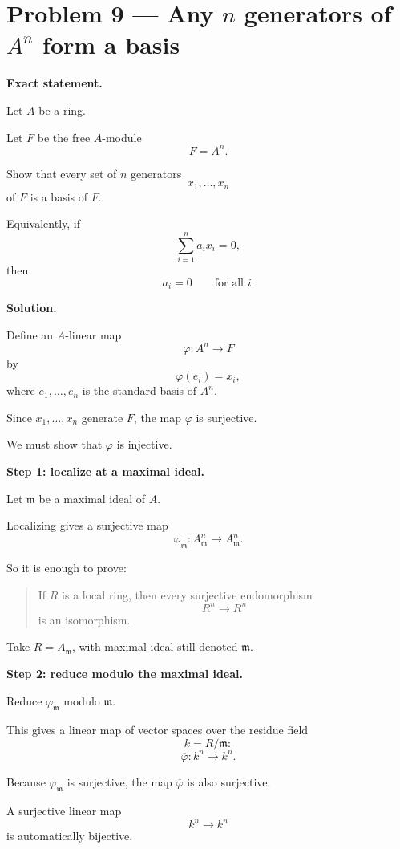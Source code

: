 \documentclass[12pt,a4paper]{article}
\theoremstyle{plain}
\theoremstyle{definition}      %
\begin{document}
	
	\section*{Problem 9 — Any \(n\) generators of \(A^n\) form a basis}
	
	\textbf{Exact statement.}
	
	Let \(A\) be a ring.
	
	Let \(F\) be the free \(A\)-module
	\[
	F=A^n.
	\]
	
	Show that every set of \(n\) generators
	\[
	x_1,\dots,x_n
	\]
	of \(F\) is a basis of \(F\).
	
	Equivalently, if
	\[
	\sum_{i=1}^n a_i x_i = 0,
	\]
	then
	\[
	a_i=0
	\qquad\text{for all }i.
	\]
	
	\bigskip
	\textbf{Solution.}
	
	Define an \(A\)-linear map
	\[
	\varphi:A^n\longrightarrow F
	\]
	by
	\[
	\varphi(e_i)=x_i,
	\]
	where \(e_1,\dots,e_n\) is the standard basis of \(A^n\).
	
	Since \(x_1,\dots,x_n\) generate \(F\), the map \(\varphi\) is surjective.
	
	We must show that \(\varphi\) is injective.
	
	\medskip
	\textbf{Step 1: localize at a maximal ideal.}
	
	Let \(\mathfrak m\) be a maximal ideal of \(A\).
	
	Localizing gives a surjective map
	\[
	\varphi_{\mathfrak m}:A_{\mathfrak m}^n\longrightarrow A_{\mathfrak m}^n.
	\]
	
	So it is enough to prove:
	
	\begin{quote}
		If \(R\) is a local ring, then every surjective endomorphism
		\[
		R^n\longrightarrow R^n
		\]
		is an isomorphism.
	\end{quote}
	
	Take \(R=A_{\mathfrak m}\), with maximal ideal still denoted \(\mathfrak m\).
	
	\medskip
	\textbf{Step 2: reduce modulo the maximal ideal.}
	
	Reduce \(\varphi_{\mathfrak m}\) modulo \(\mathfrak m\).
	
	This gives a linear map of vector spaces over the residue field
	\[
	k=R/\mathfrak m:
	\]
	\[
	\overline{\varphi}:k^n\longrightarrow k^n.
	\]
	
	Because \(\varphi_{\mathfrak m}\) is surjective, the map \(\overline{\varphi}\) is also surjective.
	
	A surjective linear map
	\[
	k^n\longrightarrow k^n
	\]
	is automatically bijective.
	
\end{document}
